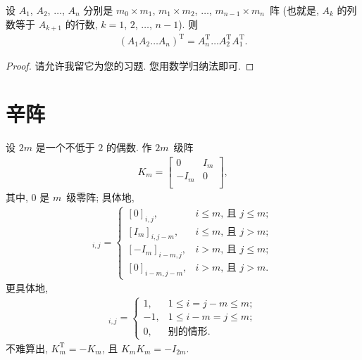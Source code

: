 \documentclass[../libro.tex]{subfiles}
\begin{document}
\begin{theorem}
    设 \(A_1\), \(A_2\), \(\dots\), \(A_n\)
    分别是 \(m_0 \times m_1\), \(m_1 \times m_2\), \(\dots\),
    \(m_{n-1} \times m_n\)~阵
    (也就是, \(A_k\) 的列数等于 \(A_{k+1}\) 的行数,
    \(k = 1\), \(2\), \(\dots\), \(n-1\)).
    则
    \begin{align*}
        (A_1 A_2 \dots A_n)^{\mathrm{T}}
        = A_n^{\mathrm{T}} \dots A_2^{\mathrm{T}} A_1^{\mathrm{T}}.
    \end{align*}
\end{theorem}

\begin{proof}
    请允许我留它为您的习题.
    您用数学归纳法即可.
\end{proof}

\section{辛阵}

设 \(2m\) 是一个不低于 \(2\) 的偶数.
作 \(2m\)~级阵
\begin{align*}
    K_m =
    \begin{bmatrix}
        0    & I_m \\
        -I_m & 0   \\
    \end{bmatrix},
\end{align*}
其中, \(0\) 是 \(m\)~级零阵;
具体地,
\begin{align*}
    [K_m]_{i,j} =
    \begin{cases}
        [0]_{i,j},
        & \text{\(i \leq m\), 且 \(j \leq m\)}; \\
        [I_m]_{i,j-m},
        & \text{\(i \leq m\), 且 \(j > m\)};    \\
        [-I_m]_{i-m,j},
        & \text{\(i > m\), 且 \(j \leq m\)};    \\
        [0]_{i-m,j-m},
        & \text{\(i > m\), 且 \(j > m\)}.
    \end{cases}
\end{align*}
更具体地,
\begin{align*}
    [K_m]_{i,j} =
    \begin{cases}
        1,  & 1 \leq i = j - m \leq m; \\
        -1, & 1 \leq i - m = j \leq m; \\
        0,  & \text{别的情形}.
    \end{cases}
\end{align*}
不难算出, \(K_m^{\mathrm{T}} = -K_m\),
且 \(K_m K_m = -I_{2m}\).
\end{document}

